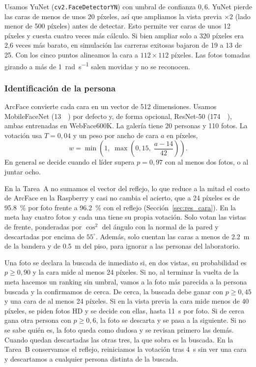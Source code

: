 \documentclass[11pt,a4paper]{article}
\begin{document}
Usamos YuNet (\texttt{cv2.FaceDetectorYN}) con umbral de confianza $0{,}6$. YuNet pierde las caras de menos de unos 20 píxeles, así que ampliamos la vista previa $\times 2$ (lado menor de 500 píxeles) antes de detectar. Esto permite ver caras de unos 12 píxeles y cuesta cuatro veces más cálculo. Si bien ampliar solo a 320 píxeles era 2,6 veces más barato, en simulación las carreras exitosas bajaron de 19 a 13 de 25. Con los cinco puntos alineamos la cara a $112\times112$ píxeles. Las fotos tomadas girando a más de \SI{1}{\radian\per\second} salen movidas y no se reconocen.

\subsubsection{Identificación de la persona}
\label{sec:ident}

ArcFace convierte cada cara en un vector de 512 dimensiones. Usamos MobileFaceNet (\SI{13}{\mega\byte}) por defecto y, de forma opcional, ResNet-50 (\SI{174}{\mega\byte}), ambas entrenadas en WebFace600K. La galería tiene 20 personas y 110 fotos. La votación usa $T = 0{,}04$ y un peso por ancho de cara $a$ en píxeles,
\begin{equation}
  w = \min\!\left(1,\; \max\!\left(0{,}15,\; \frac{a - 14}{42}\right)\right).
\end{equation}
En general se decide cuando el líder supera $p = 0{,}97$ con al menos dos fotos, o al juntar ocho.

En la Tarea~A no sumamos el vector del reflejo, lo que reduce a la mitad el costo de ArcFace en la Raspberry y casi no cambia el acierto, que a 24 píxeles es de \SI{95,8}{\percent} por foto frente a \SI{96,2}{\percent} con el reflejo (Sección~\ref{sec:res_cara}). En la meta hay cuatro fotos y cada una tiene su propia votación. Solo votan las vistas de frente, ponderadas por $\cos^2$ del ángulo con la normal de la pared y descartadas por encima de $55^\circ$. Además, solo cuentan las caras a menos de \SI{2,2}{\meter} de la bandera y de \SI{0,5}{\meter} del piso, para ignorar a las personas del laboratorio.

Una foto se declara la buscada de inmediato si, en dos vistas, su probabilidad es $p \ge 0{,}90$ y la cara mide al menos 24 píxeles. Si no, al terminar la vuelta de la meta hacemos un ranking sin umbral, vamos a la foto más parecida a la persona buscada y la confirmamos de cerca. De cerca, la buscada debe ganar con $p \ge 0{,}45$ y una cara de al menos 24 píxeles. Si en la vista previa la cara mide menos de 40 píxeles, se piden fotos HD y se decide con ellas, hasta \SI{11}{\second} por foto. Si de cerca gana otra persona con $p \ge 0{,}6$, la foto se descarta y se pasa a la siguiente. Si no se sabe quién es, la foto queda como dudosa y se revisan primero las demás. Cuando quedan descartadas las otras tres, la que sobra es la buscada. En la Tarea~B conservamos el reflejo, reiniciamos la votación tras \SI{4}{\second} sin ver una cara y descartamos a cualquier persona distinta de la buscada.
\end{document}
